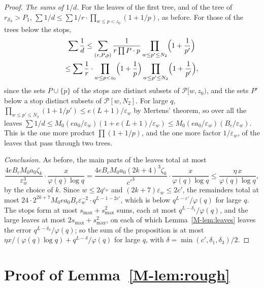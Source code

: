 \documentclass[11pt]{article}
\numberwithin{equation}{section}
\begin{document}
\begin{proof}
\emph{The sums of $1/d$.} For the leaves of the first tree, and of the tree of $r_{\mathcal S_0} > P_1$, $\sum 1/d \le
\sum 1/r \cdot \prod_{w \le p < z_0}(1 + 1/p)$, as before. For those of the trees below the stops,
\begin{multline*}
  \sum \frac1d \le \sum_{(r, P, p)} \frac1{r \prod P \cdot p} \prod_{w \le p' \le N_2}\Bigl(1 + \frac1{p'}\Bigr) \\
  \le \sum \frac1r \cdot \prod_{w \le p < z_0}\Bigl(1 + \frac1p\Bigr) \prod_{w \le p' \le N_2}\Bigl(1 +
  \frac1{p'}\Bigr),
\end{multline*}
since the sets $P \cup \{p\}$ of the stops are distinct subsets of $\mathcal P[w, z_0)$, and the sets $P'$ below a stop
distinct subsets of $\mathcal P[w, N_2]$. For large $q$, $\prod_{w \le p' \le N_2}(1 + 1/p') \le e(L + 1)/\varepsilon_w$
by Mertens' theorem, so over all the leaves $\sum 1/d \le M_0 (e a_0/\varepsilon_w)(1 + e(L + 1)/\varepsilon_w) \le M_0
(e a_0/\varepsilon_w)(B_c/\varepsilon_w)$. This is the one more product $\prod(1 + 1/p)$, and the one more factor
$1/\varepsilon_w$, of the leaves that pass through two trees.

\emph{Conclusion.} As before, the main parts of the leaves total at most
\[
  \frac{4 e B_c M_0 a_0 \zeta_k}{\varepsilon_w^3} \cdot \frac{x}{\varphi(q) \log q}
  = \frac{4 e B_c M_0 a_0 (2k + 4)^3 \zeta_k}{c'^3} \cdot \frac{x}{\varphi(q) \log q}
  \le \frac{\eta \, x}{\varphi(q) \log q},
\]
by the choice of $k$. Since $w \le 2q^{\varepsilon_w}$ and $(2k + 7)\varepsilon_w \le 2c'$, the remainders total at most
$24 \cdot 2^{2k + 7} M_0 e a_0 B_c \varepsilon_w^{-2} \cdot q^{L - 1 - 2c'}$, which is below $q^{L - c'}/\varphi(q)$ for
large $q$. The stops form at most $s_{\max} + s_{\max}^2$ sums, each at most $q^{L - \delta_1}/\varphi(q)$, and the
large leaves at most $2s_{\max} + s_{\max}^2$, on each of which Lemma~\ref{M-lem:leaves} leaves the error $q^{L -
\delta_3}/\varphi(q)$; so the sum of the proposition is at most $\eta x/(\varphi(q) \log q) + q^{L - \delta}/\varphi(q)$
for large $q$, with $\delta = \min(c', \delta_1, \delta_3)/2$.
\end{proof}

\section{Proof of Lemma~\ref{M-lem:rough}}\label{app:rough}
\end{document}
